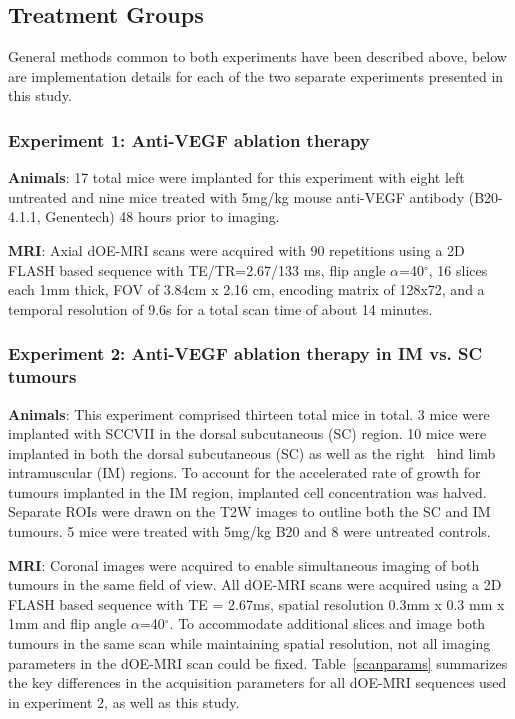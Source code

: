 \documentclass[num-refs]{wiley-article}
\begin{document}
\subsection{Treatment Groups}
General methods common to both experiments have been described above, below are implementation details for each of the two separate experiments presented in this study.

\subsubsection{Experiment 1: Anti-VEGF ablation therapy}
\noindent\textbf{Animals}: 17 total mice were implanted for this experiment with eight left untreated and nine mice treated with 5mg/kg mouse anti-VEGF antibody (B20-4.1.1, Genentech) 48 hours prior to imaging.

\noindent\textbf{MRI}: Axial dOE-MRI scans were acquired with 90 repetitions using a 2D FLASH based sequence with TE/TR=2.67/133 ms, flip angle $\alpha$=40$^\circ$, 16 slices each 1mm thick, FOV of 3.84cm x 2.16 cm, encoding matrix of 128x72, and a temporal resolution of 9.6s for a total scan time of about 14 minutes.

\subsubsection{Experiment 2: Anti-VEGF ablation therapy in IM vs. SC tumours}
\noindent\textbf{Animals}: This experiment comprised thirteen total mice in total. 
3 mice were implanted with SCCVII in the dorsal subcutaneous (SC) region.
10 mice were implanted in both the dorsal subcutaneous (SC) as well as the right~ hind limb intramuscular (IM) regions.
To account for the accelerated rate of growth for tumours implanted in the IM region, implanted cell concentration was halved.
Separate ROIs were drawn on the T2W images to outline both the SC and IM tumours.
5 mice were treated with 5mg/kg B20 and 8 were untreated controls. 

\noindent\textbf{MRI}: Coronal images were acquired to enable simultaneous imaging of both tumours in the same field of view.
All dOE-MRI scans were acquired using a 2D FLASH based sequence with TE = 2.67ms, spatial resolution 0.3mm x 0.3 mm x 1mm and flip angle $\alpha$=40$^\circ$.
To accommodate additional slices and image both tumours in the same scan while maintaining spatial resolution, not all imaging parameters in the dOE-MRI scan could be fixed. 
Table~\ref{scanparams} summarizes the key differences in the acquisition parameters for all dOE-MRI sequences used in experiment 2, as well as this study.
\end{document}
